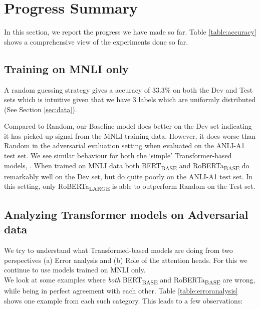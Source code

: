 \section{Progress Summary}
\label{sec:progress}




In this section, we report the progress we have made so far. Table \ref{table:accuracy} shows a comprehensive view of the experiments done so far.

\subsection{Training on MNLI only}
\label{subsec:trainmnli}

A random guessing strategy gives a accuracy of 33.3\% on both the Dev and Test sets which is intuitive given that we have 3 labels which are uniformly distributed (See Section \ref{sec:data}). 

Compared to Random, our Baseline model does better on the Dev set indicating it has picked up signal from the MNLI training data. However, it does worse than Random in the adversarial evaluation setting when evaluated on the ANLI-A1 test set. We see similar behaviour for both the `simple' Transformer-based models, . When trained on MNLI data both BERT\textsubscript{BASE} and RoBERTa\textsubscript{BASE} do remarkably well on the Dev set, but do quite poorly on the ANLI-A1 test set. In this setting, only RoBERTa\textsubscript{LARGE} is able to outperform Random on the Test set.

\subsection{Analyzing Transformer models on Adversarial data}
\label{subsec:analyzetransformeradversarial}

We try to understand what Transformed-based models are doing from two perspectives (a) Error analysis and (b) Role of the attention heads. For this we continue to use models trained on MNLI only. \\

 We look at some examples where \textit{both} BERT\textsubscript{BASE} and RoBERTa\textsubscript{BASE} are wrong, while being in perfect agreement with each other. Table \ref{table:erroranalysis} shows one example from each such category. This leads to a few observations:

